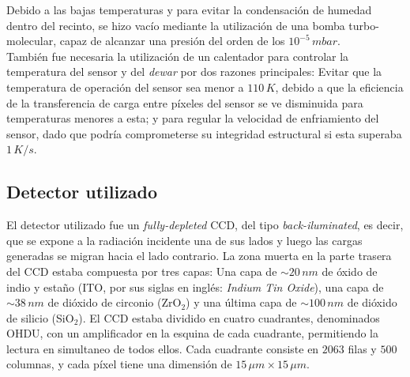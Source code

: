 Debido a las bajas temperaturas y para evitar la condensación de humedad dentro del recinto, se hizo vacío mediante la utilización de una bomba turbo-molecular, capaz de alcanzar una presión del orden de los $10^{-5}\,\si{mbar}$.\\
\indent También fue necesaria la utilización de un calentador para controlar la temperatura del sensor y del \textit{dewar} por dos razones principales: Evitar que la temperatura de operación del sensor sea menor a $110\,\si{K}$, debido a que la eficiencia de la transferencia de carga entre píxeles del sensor se ve disminuida para temperaturas menores a esta; y para regular la velocidad de enfriamiento del sensor, dado que podría comprometerse su integridad estructural si esta superaba $1\,\si{K/s}$.\\
\subsection{Detector utilizado}
\noindent El detector utilizado fue un \textit{fully-depleted} CCD, del tipo \textit{back-iluminated}, es decir, que se expone a la radiación incidente una de sus lados y luego las cargas generadas se migran hacia el lado contrario. La zona muerta en la parte trasera del CCD estaba compuesta por tres capas: Una capa de $\sim 20\,\si{nm}$ de óxido de indio y estaño (ITO, por sus siglas en inglés: \textit{Indium Tin Oxide}), una capa de $\sim 38\,\si{nm}$ de dióxido de circonio (ZrO$_{2}$) y una última capa de $\sim 100\,\si{nm}$ de dióxido de silicio (SiO$_{2}$). El CCD estaba dividido en cuatro cuadrantes, denominados OHDU, con un amplificador en la esquina de cada cuadrante, permitiendo la lectura en simultaneo de todos ellos. Cada cuadrante consiste en $2063$ filas y $500$ columnas, y cada píxel tiene una dimensión de $15\,\si{\mu m} \times 15\,\si{\mu m}$.
